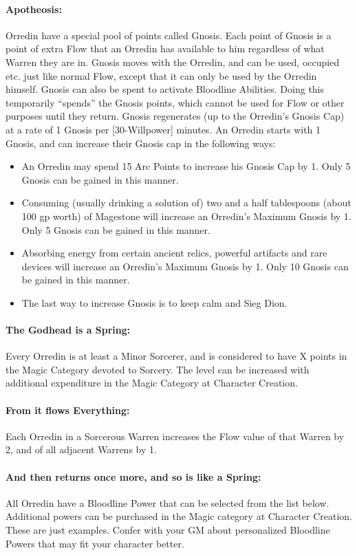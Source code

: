 \documentclass[oneside,11pt,english]{book}
\begin{document}
\paragraph{Apotheosis:} Orredin have a special pool of points called Gnosis. Each point of Gnosis is a point of extra 
Flow that an Orredin has available to him regardless of what Warren they are in. Gnosis moves with the 
Orredin, and can be used, occupied etc. just like normal Flow, except that it can only be used by the 
Orredin himself. 
Gnosis can also be spent to activate Bloodline Abilities. Doing this temporarily “spends” the Gnosis 
points, which cannot be used for Flow or other purposes until they return. Gnosis regenerates (up to the 
Orredin’s Gnosis Cap) at a rate of 1 Gnosis per [30-Willpower] minutes. 
An Orredin starts with 1 Gnosis, and can increase their Gnosis cap in the following ways:
\begin{itemize}
	\item An Orredin may spend 15 Arc Points to increase his Gnosis Cap by 1. Only 5 Gnosis can be gained in this manner. 
	\item Consuming (usually drinking a solution of) two and a half tablespoons (about 100 gp worth) of Magestone will increase an Orredin's Maximum Gnosis by 1. Only 5 Gnosis can be gained in this manner.
	\item Absorbing energy from certain ancient relics, powerful artifacts and rare devices will increase an Orredin's Maximum Gnosis by 1. Only 10 Gnosis can be gained in this manner. 
	\item The last way to increase Gnosis is to keep calm and Sieg Dion.
\end{itemize}
\paragraph{The Godhead is a Spring:} Every Orredin is at least a Minor Sorcerer, and is considered to have X points in the Magic Category devoted to Sorcery. The level can be increased with additional expenditure in the Magic Category at Character Creation. 
\paragraph{From it flows Everything:} Each Orredin in a Sorcerous Warren increases the Flow value of that Warren by 2, and of all adjacent Warrens by 1.
\paragraph{And then returns once more, and so is like a Spring:} All Orredin have a Bloodline Power that can be selected from the list below. Additional powers can be purchased in the Magic category at Character Creation. These are just examples. Confer with your GM about personalized Bloodline Powers that may fit your character better.
\end{document}
